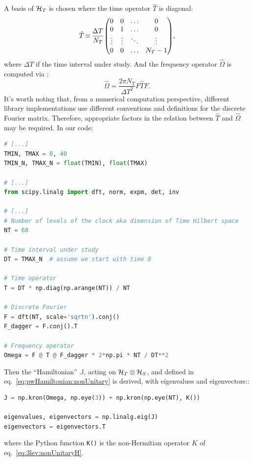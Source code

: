 A basis of $\mathcal{H}_T$ is chosen where the time operator $\hat{T}$ is diagonal:
\begin{equation}
  \hat{T} \repr \frac{\Delta T}{N_T} \mqty(
                                          0       &0      &\ldots &0        \\
                                          0       &1      &\ldots &0        \\
                                          \vdots  &\vdots &\ddots &\vdots   \\
                                          0       &0      &\ldots &N_{T}-1
                                        ) \text{,}
\end{equation}
where $\Delta T$ if the time interval under study.
And the frequency operator $\hat{\Omega}$ is computed via :
\begin{equation}
  \hat{\Omega} = \frac{2\pi N_T}{\Delta{T}^2} F \hat{T} F \text{.}
\end{equation}
It's worth noting that, from a numerical computation perspective,
different library implementations use different conventions and definitions
for the discrete Fourier matrix. Therefore,
appropriate factors in the relation between $\hat{T}$ and $\hat{\Omega}$
may be required.
In our code:
\begin{lstlisting}[language=Python]
# [...]
TMIN, TMAX = 0, 40
TMIN_N, TMAX_N = float(TMIN), float(TMAX)

# [...]
from scipy.linalg import dft, norm, expm, det, inv

# [...]
# Number of levels of the clock aka dimension of Time Hilbert space
NT = 60

# Time interval under study
DT = TMAX_N  # assume we start with time 0

# Time operator
T = DT * np.diag(np.arange(NT)) / NT

# Discrete Fourier
F = dft(NT, scale='sqrtn').conj()
F_dagger = F.conj().T

# Frequency operator
Omega = F @ T @ F_dagger * 2*np.pi * NT / DT**2
\end{lstlisting}

Then the ``Hamiltonian'' ${\mathbb{J}}$, acting on $\mathcal{H}_T \otimes \mathcal{H}_S$, and defined in eq.~\eqref{eq:pwHamiltonian:nonUnitary}
is derived, with eigenvalues and eigenvectors::
\begin{lstlisting}[language=Python]
J = np.kron(Omega, np.eye(3)) + np.kron(np.eye(NT), K())
 
eigenvalues, eigenvectors = np.linalg.eig(J)
eigenvectors = eigenvectors.T
\end{lstlisting}
where the Python function \verb|K()| is the non-Hermitian operator $K$ of eq.~\eqref{eq:3lev:nonUnitaryH}.

